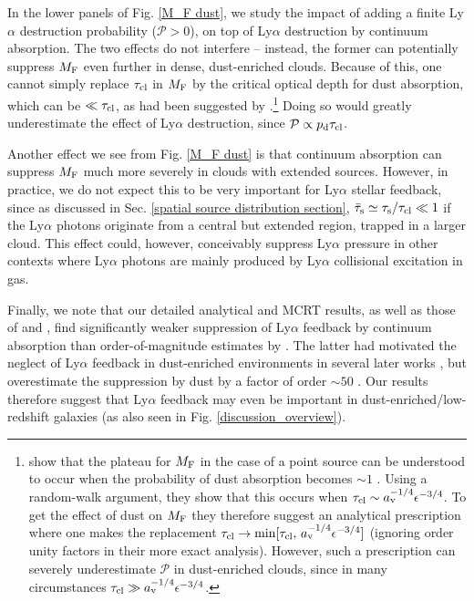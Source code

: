 \documentclass[fleqn,usenatbib]{mnras}
\newcommand{\taucl}{\tau_{\rm cl}}
\newcommand\HI{\ion{H}{I}\xspace} %
\newcommand\HII{\ion{H}{II}\xspace} %
\begin{document}
In the lower panels of Fig. \ref{M_F dust}, we study the impact of adding a finite Ly$\alpha$ destruction probability ($\mathcal{P}>0$), on top of Ly$\alpha$ destruction by continuum absorption. The two effects do not interfere -- instead, the former can potentially suppress $M_{\rm F}$ even further in dense, dust-enriched clouds. Because of this, one cannot simply replace $\taucl$ in $M_{\rm F}$ by the critical optical depth for dust absorption, which can be $\ll \tau_{\rm cl}$, as had been suggested by \cite{Tomaselli2021}.\footnote{\cite{Tomaselli2021} show that the plateau for $M_{\rm F}$ in the case of a point source can be understood to occur when the probability of dust absorption becomes $\sim 1$ \citep[see also][]{Kimm2018}. Using a random-walk argument, they show that this occurs when $\taucl \sim a_{\rm v}^{-1/4} \epsilon^{-3/4}$. To get the effect of dust on $M_{\rm F}$ they therefore suggest an analytical prescription where one makes the replacement $\taucl \rightarrow \min[\taucl, \, a_{\rm v}^{-1/4} \epsilon^{-3/4}]$ (ignoring order unity factors in their more exact analysis). However, such a prescription can severely underestimate $\mathcal{P}$ in dust-enriched clouds, since in many circumstances $\taucl \gg a_{\rm v}^{-1/4} \epsilon^{-3/4}$.} Doing so would greatly underestimate the effect of Ly$\alpha$ destruction, since $\mathcal{P} \propto p_{\rm d} \taucl$. 

Another effect we see from Fig. \ref{M_F dust} is that continuum absorption can suppress $M_{\rm F}$ much more severely in clouds with extended sources. However, in practice, we do not expect this to be very important for Ly$\alpha$ stellar feedback, since as discussed in Sec. \ref{spatial source distribution section}, $\Bar{\tau}_{\rm s} \simeq \tau_{\rm s}/\taucl \ll 1$ if the Ly$\alpha$ photons originate from a central but extended \HII region, trapped in a larger \HI cloud. This effect could, however, conceivably suppress Ly$\alpha$ pressure in other contexts where Ly$\alpha$ photons are mainly produced by Ly$\alpha$ collisional excitation in \HI gas.

Finally, we note that our detailed analytical and MCRT results, as well as those of \cite{Kimm2018} and \cite{Tomaselli2021}, find significantly weaker suppression of Ly$\alpha$ feedback by continuum absorption than order-of-magnitude estimates by \cite{Henney1998}. The latter had motivated the neglect of Ly$\alpha$ feedback in dust-enriched environments in several later works \citep[e.g.][]{Krumholz2009, Draine2011_radpressure, Wise2012radpressure, Jeffreson2021, Olivier2021}, but overestimate the suppression by dust by a factor of order $\sim 50$ \citep[as recently pointed out by][]{Thomson2024}. Our results therefore suggest that Ly$\alpha$ feedback may even be important in dust-enriched/low-redshift galaxies (as also seen in Fig. \ref{discussion_overview}).
\end{document}
